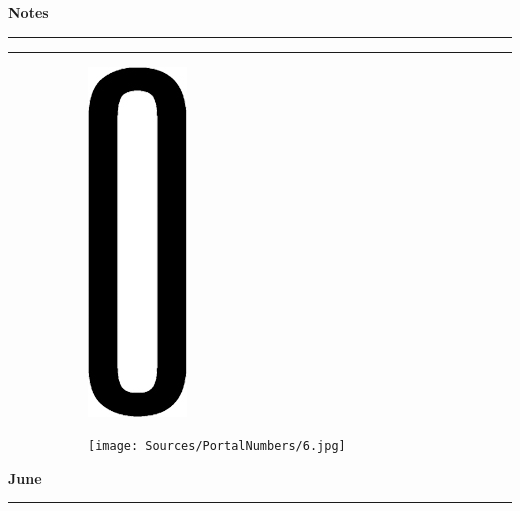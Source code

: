 \newpage
\begin{notesbox}
\textbf{Notes} \\
\rule{\linewidth}{0.02cm}
\end{notesbox}


\newpage
\rule{\linewidth}{0.1cm} \par
\begin{figure}[H]
  \begin{subfigure}[l]{0.15\textwidth}
    \includegraphics[height=0.35\textheight]{Sources/PortalNumbers/0.jpg}
  \end{subfigure}
  \hspace{0.3cm}
  \begin{subfigure}[l]{0.5\textwidth}
    \texttt{[image: Sources/PortalNumbers/6.jpg]}
  \end{subfigure}
  
\end{figure}

 \hfill \sffamily\textbf{\fontsize{16}{20}\selectfont June} \par
\rule{\linewidth}{0.1cm} \par


